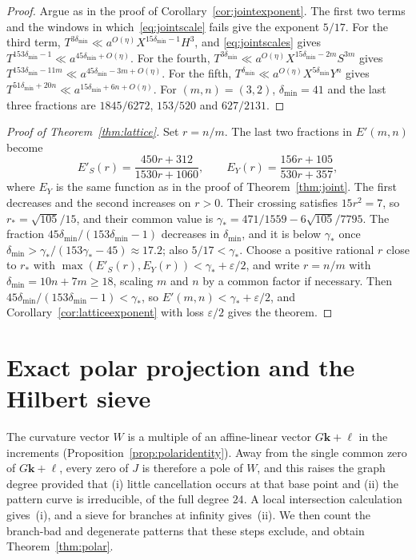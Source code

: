 \documentclass[11pt]{article}
\theoremstyle{definition}
\theoremstyle{remark}
\begin{document}
\begin{proof}
Argue as in the proof of Corollary~\ref{cor:jointexponent}. The first two terms and the windows in which~\eqref{eq:jointscale}
fails give the exponent $5/17$. For the third term, $T^{3\delta_{\min}}\ll a^{O(\eta)}X^{15\delta_{\min}-1}H^3$, and
\eqref{eq:jointscales} gives $T^{153\delta_{\min}-1}\ll a^{45\delta_{\min}+O(\eta)}$. For the fourth,
$T^{3\delta_{\min}}\ll a^{O(\eta)}X^{15\delta_{\min}-2m}S^{3m}$ gives $T^{153\delta_{\min}-11m}\ll a^{45\delta_{\min}-3m+O(\eta)}$. For the
fifth, $T^{\delta_{\min}}\ll a^{O(\eta)}X^{5\delta_{\min}}Y^n$ gives $T^{51\delta_{\min}+20n}\ll a^{15\delta_{\min}+6n+O(\eta)}$. For
$(m,n)=(3,2)$, $\delta_{\min}=41$ and the last three fractions are $1845/6272$, $153/520$ and $627/2131$.
\end{proof}

\begin{proof}[Proof of Theorem~\ref{thm:lattice}]
Set $r=n/m$. The last two fractions in $E'(m,n)$ become
\[
 E'_S(r)=\frac{450r+312}{1530r+1060},\qquad
 E_Y(r)=\frac{156r+105}{530r+357},
\]
where $E_Y$ is the same function as in the proof of Theorem~\ref{thm:joint}. The first decreases
and the second increases on $r>0$. Their crossing satisfies $15r^2=7$, so $r_*=\sqrt{105}/15$, and
their common value is $\gamma_*=471/1559-6\sqrt{105}/7795$. The fraction $45\delta_{\min}/(153\delta_{\min}-1)$ decreases
in $\delta_{\min}$, and it is below $\gamma_*$ once $\delta_{\min}>\gamma_*/(153\gamma_*-45)\approx17.2$; also
$5/17<\gamma_*$. Choose a positive rational $r$ close to $r_*$ with
$\max(E'_S(r),E_Y(r))<\gamma_*+\varepsilon/2$, and write $r=n/m$ with
$\delta_{\min}=10n+7m\ge18$, scaling $m$ and $n$ by a common factor if necessary.
Then $45\delta_{\min}/(153\delta_{\min}-1)<\gamma_*$, so
$E'(m,n)<\gamma_*+\varepsilon/2$, and Corollary~\ref{cor:latticeexponent} with loss
$\varepsilon/2$ gives the theorem.
\end{proof}

\section{Exact polar projection and the Hilbert sieve}\label{sec:polar}

The curvature vector $W$ is a multiple of an affine-linear vector
$G\mathbf k+\ell$ in the increments (Proposition~\ref{prop:polaridentity}). Away
from the single common zero of $G\mathbf k+\ell$, every zero of $J$ is
therefore a pole of $W$, and this raises the graph degree provided that
(i) little cancellation occurs at that base point and (ii) the pattern curve is
irreducible, of the full degree $24$. A local intersection calculation gives~(i), and a sieve
for branches at infinity gives~(ii). We then count the branch-bad and
degenerate patterns that these steps exclude, and obtain Theorem~\ref{thm:polar}.
\end{document}
